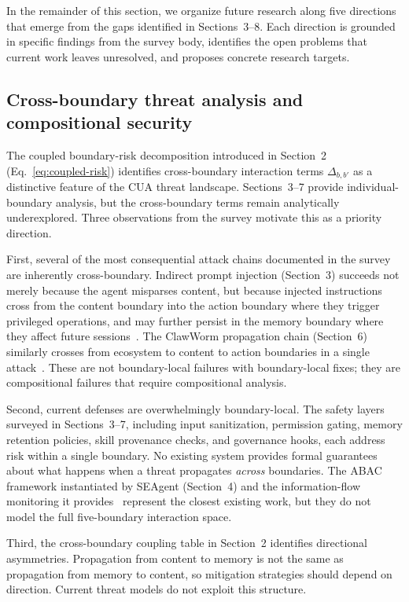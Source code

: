 In the remainder of this section, we organize future research along five directions that emerge from the gaps identified in Sections~3--8. Each direction is grounded in specific findings from the survey body, identifies the open problems that current work leaves unresolved, and proposes concrete research targets.

\subsection{Cross-boundary threat analysis and compositional security}
\label{sec:future-cross-boundary}

The coupled boundary-risk decomposition introduced in Section~2 (Eq.~\ref{eq:coupled-risk}) identifies cross-boundary interaction terms $\Delta_{b,b'}$ as a distinctive feature of the CUA threat landscape. Sections~3--7 provide individual-boundary analysis, but the cross-boundary terms remain analytically underexplored. Three observations from the survey motivate this as a priority direction.

First, several of the most consequential attack chains documented in the survey are inherently cross-boundary. Indirect prompt injection (Section~3) succeeds not merely because the agent misparses content, but because injected instructions cross from the content boundary into the action boundary where they trigger privileged operations, and may further persist in the memory boundary where they affect future sessions~\cite{doubleagent2026}. The ClawWorm propagation chain (Section~6) similarly crosses from ecosystem to content to action boundaries in a single attack~\cite{clawworm2026}. These are not boundary-local failures with boundary-local fixes; they are compositional failures that require compositional analysis.

Second, current defenses are overwhelmingly boundary-local. The safety layers surveyed in Sections~3--7, including input sanitization, permission gating, memory retention policies, skill provenance checks, and governance hooks, each address risk within a single boundary. No existing system provides formal guarantees about what happens when a threat propagates \emph{across} boundaries. The ABAC framework instantiated by SEAgent (Section~4) and the information-flow monitoring it provides~\cite{seagent2026} represent the closest existing work, but they do not model the full five-boundary interaction space.

Third, the cross-boundary coupling table in Section~2 identifies directional asymmetries. Propagation from content to memory is not the same as propagation from memory to content, so mitigation strategies should depend on direction. Current threat models do not exploit this structure.


